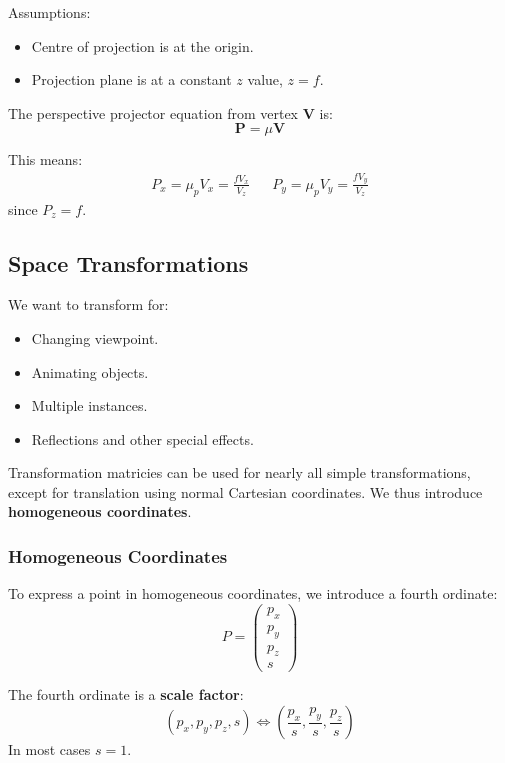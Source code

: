 \documentclass[11pt]{article}
\begin{document}
Assumptions:
\begin{itemize}
  \item Centre of projection is at the origin.
  \item Projection plane is at a constant $z$ value, $z = f$.
\end{itemize}

The perspective projector equation from vertex $\bm{V}$ is:
\[ \bm{P} = \mu \bm{V} \]

This means:
\begin{align*}
  P_x = \mu_p V_x = \frac{fV_x}{V_z} && P_y = \mu_p V_y = \frac{fV_y}{V_z}
\end{align*}
since $P_z = f$.

\subsection{Space Transformations}
We want to transform for:
\begin{itemize}
  \item Changing viewpoint.
  \item Animating objects.
  \item Multiple instances.
  \item Reflections and other special effects.
\end{itemize}

Transformation matricies can be used for nearly all simple transformations, except for translation using normal Cartesian coordinates.
We thus introduce \textbf{homogeneous coordinates}.

\subsubsection{Homogeneous Coordinates}
To express a point in homogeneous coordinates, we introduce a fourth ordinate:
\[ P = \begin{pmatrix} p_x \\ p_y \\ p_z \\ s \end{pmatrix} \]

The fourth ordinate is a \textbf{scale factor}:
\[ (p_x, p_y, p_z, s) \Leftrightarrow (\frac{p_x}{s}, \frac{p_y}{s}, \frac{p_z}{s}) \]
In most cases $s = 1$.
\end{document}
